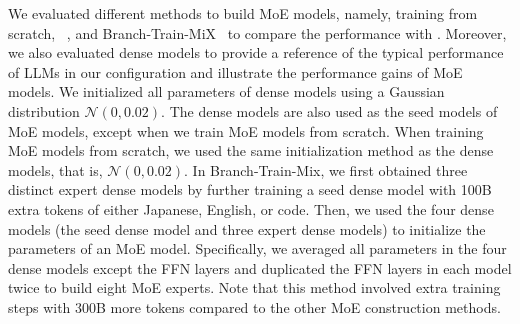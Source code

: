 We evaluated  different methods to build MoE models, namely, training from scratch, \NUname{}~\citep{komatsuzaki2023sparse}, 
 and Branch-Train-MiX~\citep{sukhbaatar2024branchtrainmix} to compare the performance with \methodname{}.
Moreover, we also evaluated dense models to provide a reference of the typical performance of LLMs in our configuration and illustrate the performance gains of MoE models.
We initialized all parameters of dense models using a Gaussian distribution $\mathcal{N}(0, 0.02)$.
The dense models are also used as the seed models of MoE models, except when we train MoE models from scratch.
%
When training MoE models from scratch, we used the same initialization method as the dense models, that is, $\mathcal{N}(0, 0.02)$.
%
%
In Branch-Train-Mix, we first obtained three distinct expert dense models by further training a seed dense model with 100B extra tokens of either Japanese, English, or code. 
Then, we used the four dense models (the seed dense model and three expert dense models) to initialize the parameters of an MoE model.
Specifically, we averaged all parameters in the four dense models except the FFN layers and duplicated the FFN layers in each model twice to build eight MoE experts.
Note that this method involved extra training steps with 300B more tokens compared to the other MoE construction methods.








